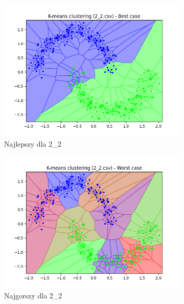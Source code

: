 \documentclass[12pt]{article}
\begin{document}
\begin{figure}[H]
\begin{subfigure}[b]{0.24\textwidth}
        \includegraphics[width=\linewidth]{img/exp_2/kmeans/2_2_best.png}
        \caption{Najlepszy dla 2\_2}
    \end{subfigure}
    \hfill
    \begin{subfigure}[b]{0.24\textwidth}
        \includegraphics[width=\linewidth]{img/exp_2/kmeans/2_2_worst.png}
        \caption{Najgorszy dla 2\_2}
    \end{subfigure}
    \hfill
    \begin{subfigure}[b]{0.24\textwidth}

\end{subfigure}
\end{figure}
\end{document}
